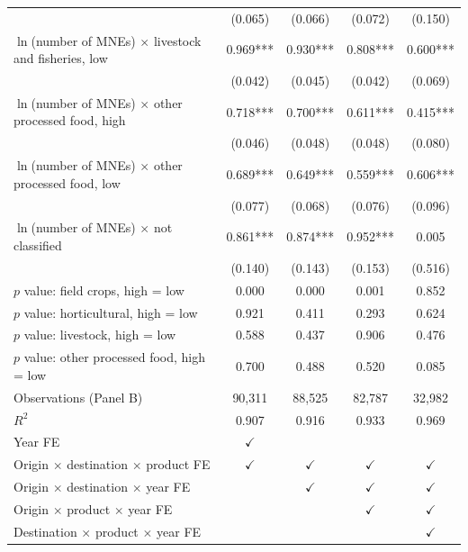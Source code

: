 \begin{tabular}{l*{4}{c}}
 & (0.065) & (0.066) & (0.072) & (0.150) \\
$\ln$(number of MNEs) $\times$ livestock and fisheries, low & 0.969*** & 0.930*** & 0.808*** & 0.600*** \\
 & (0.042) & (0.045) & (0.042) & (0.069) \\
$\ln$(number of MNEs) $\times$ other processed food, high & 0.718*** & 0.700*** & 0.611*** & 0.415*** \\
 & (0.046) & (0.048) & (0.048) & (0.080) \\
$\ln$(number of MNEs) $\times$ other processed food, low & 0.689*** & 0.649*** & 0.559*** & 0.606*** \\
 & (0.077) & (0.068) & (0.076) & (0.096) \\
$\ln$(number of MNEs) $\times$ not classified & 0.861*** & 0.874*** & 0.952*** & 0.005 \\
 & (0.140) & (0.143) & (0.153) & (0.516) \\
$p$ value: field crops, high = low & 0.000 & 0.000 & 0.001 & 0.852 \\
$p$ value: horticultural, high = low & 0.921 & 0.411 & 0.293 & 0.624 \\
$p$ value: livestock, high = low & 0.588 & 0.437 & 0.906 & 0.476 \\
$p$ value: other processed food, high = low & 0.700 & 0.488 & 0.520 & 0.085 \\
Observations (Panel B) & 90,311 & 88,525 & 82,787 & 32,982 \\
$R^2$ & 0.907 & 0.916 & 0.933 & 0.969 \\
\midrule
Year FE & $\checkmark$ &  &  &  \\
Origin $\times$ destination $\times$ product FE & $\checkmark$ & $\checkmark$ & $\checkmark$ & $\checkmark$ \\
Origin $\times$ destination $\times$ year FE &  & $\checkmark$ & $\checkmark$ & $\checkmark$ \\
Origin $\times$ product $\times$ year FE &  &  & $\checkmark$ & $\checkmark$ \\
Destination $\times$ product $\times$ year FE &  &  &  & $\checkmark$ \\
\bottomrule
\end{tabular}
